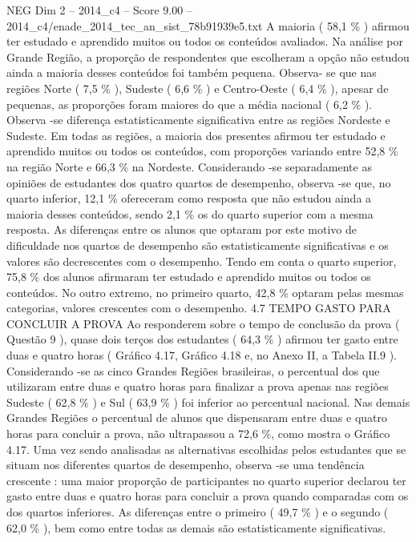 \begin{textsample}{NEG Dim 2 – 2014\_c4 – Score 9.00 – 2014\_c4/enade\_2014\_tec\_an\_sist\_78b91939e5.txt}
A maioria ( 58,1 \% ) afirmou ter estudado e aprendido muitos ou todos os conteúdos avaliados.
Na análise por Grande Região, a proporção de respondentes que escolheram a opção não estudou ainda a maioria desses conteúdos foi também pequena.
Observa- se que nas regiões Norte ( 7,5 \% ), Sudeste ( 6,6 \% ) e Centro-Oeste ( 6,4 \% ), apesar de pequenas, as proporções foram maiores do que a média nacional ( 6,2 \% ).
Observa -se diferença estatisticamente significativa entre as regiões Nordeste e Sudeste.
Em todas as regiões, a maioria dos presentes afirmou ter estudado e aprendido muitos ou todos os conteúdos, com proporções variando entre 52,8 \% na região Norte e 66,3 \% na Nordeste.
Considerando -se separadamente as opiniões de estudantes dos quatro quartos de desempenho, observa -se que, no quarto inferior, 12,1 \% ofereceram como resposta que não estudou ainda a maioria desses conteúdos, sendo 2,1 \% os do quarto superior com a mesma resposta.
As diferenças entre os alunos que optaram por este motivo de dificuldade nos quartos de desempenho são estatisticamente significativas e os valores são decrescentes com o desempenho.
Tendo em conta o quarto superior, 75,8 \% dos alunos afirmaram ter estudado e aprendido muitos ou todos os conteúdos.
No outro extremo, no primeiro quarto, 42,8 \% optaram pelas mesmas categorias, valores crescentes com o desempenho. 4.7 TEMPO GASTO PARA CONCLUIR A PROVA Ao responderem sobre o tempo de conclusão da prova ( Questão 9 ), quase dois terços dos estudantes ( 64,3 \% ) afirmou ter gasto entre duas e quatro horas ( Gráfico 4.17, Gráfico 4.18 e, no Anexo II, a Tabela II.9 ).
Considerando -se as cinco Grandes Regiões brasileiras, o percentual dos que utilizaram entre duas e quatro horas para finalizar a prova apenas nas regiões Sudeste ( 62,8 \% ) e Sul ( 63,9 \% ) foi inferior ao percentual nacional.
Nas demais Grandes Regiões o percentual de alunos que dispensaram entre duas e quatro horas para concluir a prova, não ultrapassou a 72,6 \%, como mostra o Gráfico 4.17.
Uma vez sendo analisadas as alternativas escolhidas pelos estudantes que se situam nos diferentes quartos de desempenho, observa -se uma tendência crescente : uma maior proporção de participantes no quarto superior declarou ter gasto entre duas e quatro horas para concluir a prova quando comparadas com os dos quartos inferiores.
As diferenças entre o primeiro ( 49,7 \% ) e o segundo ( 62,0 \% ), bem como entre todas as demais são estatisticamente significativas.

\end{textsample}
